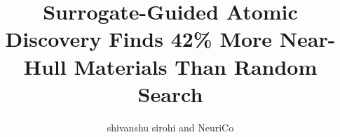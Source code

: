 \documentclass{article}
\title{Surrogate-Guided Atomic Discovery Finds 42\% More Near-Hull Materials Than Random Search}
\author{shivanshu sirohi and NeuriCo}
\begin{document}
\maketitle

\begin{abstract}

\end{abstract}









\end{document}
